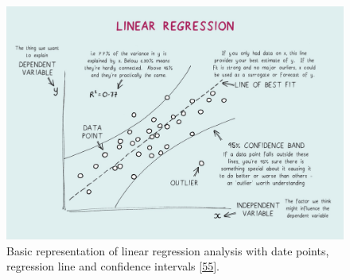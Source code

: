 \documentclass[a4paper,11pt]{article}
\begin{document}
\begin{figure}

{\centering \includegraphics[width=1\linewidth]{figures/regression} 

}

\caption{Basic representation of linear regression analysis with date points, regression line and confidence intervals {[}\protect\hyperlink{ref-JasonWong.2020}{55}{]}.}\label{fig:regression}
\end{figure}
\end{document}
